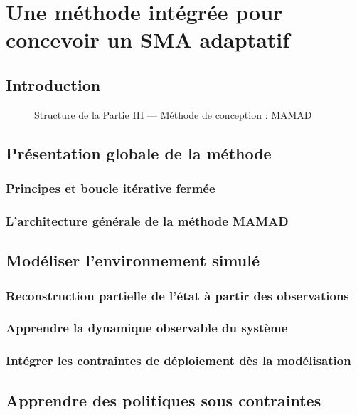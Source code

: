 \documentclass[ twoside,openright,titlepage,numbers=noenddot,headinclude,%
                footinclude=true,cleardoublepage=empty,abstractoff, %
                BCOR=5mm,paper=a4,fontsize=11pt,%
                french,american,%
                ]{scrreprt}
\begin{document}
\part{Une méthode intégrée pour concevoir un SMA adaptatif}

\chapter*{Introduction}

\begin{figure}[h!]
    \centering
    
    \caption{Structure de la Partie III — Méthode de conception : MAMAD}
\end{figure}

\chapter{Présentation globale de la méthode}

\section{Principes et boucle itérative fermée}

\section{L’architecture générale de la méthode MAMAD}

\chapter{Modéliser l’environnement simulé}
\section{Reconstruction partielle de l’état à partir des observations}
\section{Apprendre la dynamique observable du système}
\section{Intégrer les contraintes de déploiement dès la modélisation}

\chapter{Apprendre des politiques sous contraintes}
\end{document}
